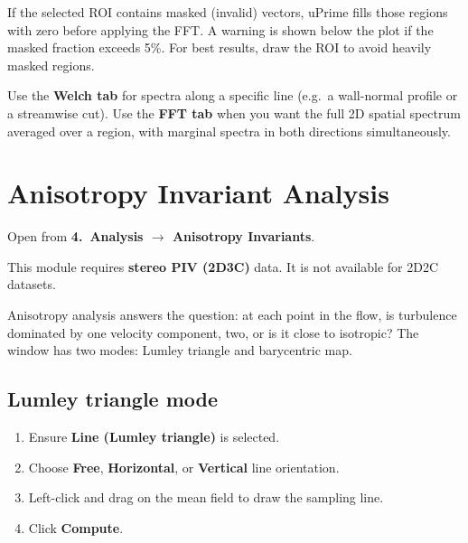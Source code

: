\documentclass[11pt, a4paper]{report}
\newcommand{\uipth}[1]{\textbf{\textcolor{upblue}{#1}}}
\begin{document}
\begin{notebox}
If the selected ROI contains masked (invalid) vectors, uPrime fills those regions with zero before applying the FFT. A warning is shown below the plot if the masked fraction exceeds 5\%. For best results, draw the ROI to avoid heavily masked regions.
\end{notebox}

\begin{tipbox}
Use the \textbf{Welch tab} for spectra along a specific line (e.g.\ a wall-normal profile or a streamwise cut). Use the \textbf{FFT tab} when you want the full 2D spatial spectrum averaged over a region, with marginal spectra in both directions simultaneously.
\end{tipbox}

\chapter{Anisotropy Invariant Analysis}
\label{ch:anisotropy}

Open from \uipth{4.\ Analysis $\to$ Anisotropy Invariants}.

\begin{notebox}
This module requires \textbf{stereo PIV (2D3C)} data. It is not available for 2D2C datasets.
\end{notebox}

Anisotropy analysis answers the question: at each point in the flow, is turbulence dominated by one velocity component, two, or is it close to isotropic? The window has two modes: Lumley triangle and barycentric map.

\section{Lumley triangle mode}

\begin{stepbox}
\begin{enumerate}[leftmargin=1.5em, topsep=2pt]
  \item Ensure \uipth{Line (Lumley triangle)} is selected.
  \item Choose \uipth{Free}, \uipth{Horizontal}, or \uipth{Vertical} line orientation.
  \item Left-click and drag on the mean field to draw the sampling line.
  \item Click \uipth{Compute}.
\end{enumerate}
\end{stepbox}
\end{document}
